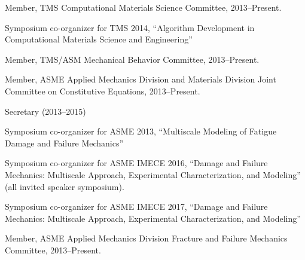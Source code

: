 \begin{list2}
\item Member, TMS Computational Materials Science Committee, 2013--Present.
\begin{list2}
\item	Symposium co-organizer for TMS 2014, ``Algorithm Development in Computational Materials Science and Engineering''
\end{list2}

\item Member, TMS/ASM Mechanical Behavior Committee, 2013--Present.

\item Member, ASME Applied Mechanics Division and Materials Division Joint Committee on Constitutive Equations, 2013--Present.
\begin{list2}
\item Secretary (2013--2015)
\item	Symposium co-organizer for ASME 2013, ``Multiscale Modeling of Fatigue Damage and Failure Mechanics''
\item Symposium co-organizer for ASME IMECE 2016, ``Damage and Failure Mechanics: Multiscale Approach, Experimental Characterization, and Modeling'' (all invited speaker symposium).
\item Symposium co-organizer for ASME IMECE 2017, ``Damage and Failure Mechanics: Multiscale Approach, Experimental Characterization, and Modeling''
\end{list2}
\item Member, ASME Applied Mechanics Division Fracture and Failure Mechanics Committee, 2013--Present.


\end{list2}
